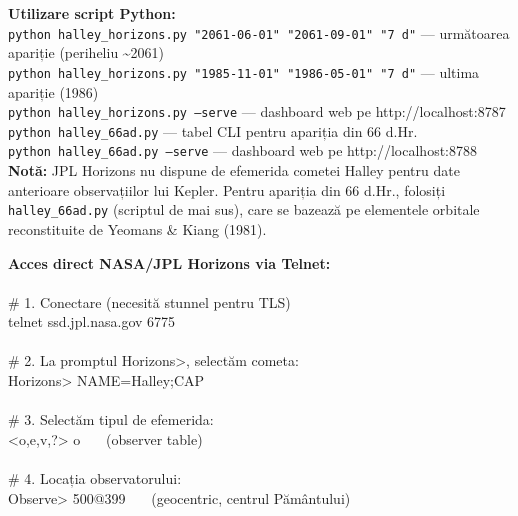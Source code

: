 \documentclass[12pt,a4paper,twoside,openany]{book}
\begin{document}
\textbf{Utilizare script Python:} \\

\texttt{python halley\_horizons.py "2061-06-01" "2061-09-01" "7 d"} — următoarea apariție (periheliu \textasciitilde{}2061) \\

\texttt{python halley\_horizons.py "1985-11-01" "1986-05-01" "7 d"} — ultima apariție (1986) \\

\texttt{python halley\_horizons.py --serve} — dashboard web pe http://localhost:8787 \\

\texttt{python halley\_66ad.py} — tabel CLI pentru apariția din 66 d.Hr. \\

\texttt{python halley\_66ad.py --serve} — dashboard web pe http://localhost:8788 \\

\textbf{Notă:} JPL Horizons nu dispune de efemerida cometei Halley pentru date anterioare observațiilor lui Kepler. Pentru apariția din 66 d.Hr., folosiți \texttt{halley\_66ad.py} (scriptul de mai sus), care se bazează pe elementele orbitale reconstituite de Yeomans \& Kiang (1981).

\textbf{Acces direct NASA/JPL Horizons via Telnet:} \\
 \\

\# 1. Conectare (necesită stunnel pentru TLS) \\

telnet ssd.jpl.nasa.gov 6775 \\
 \\

\# 2. La promptul Horizons>, selectăm cometa: \\

Horizons> NAME=Halley;CAP \\
 \\

\# 3. Selectăm tipul de efemerida: \\

<o,e,v,?> o    (observer table) \\
 \\

\# 4. Locația observatorului: \\

Observe> 500@399    (geocentric, centrul Pământului) \\
 \\
\end{document}

